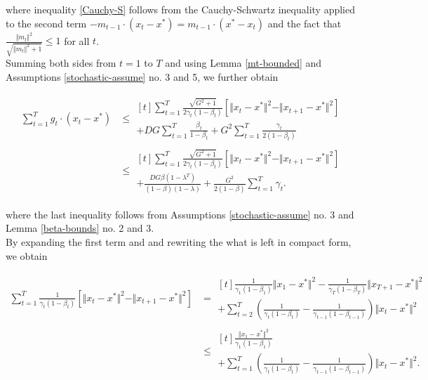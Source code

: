 \documentclass{article}
\begin{document}
where inequality \ref{Cauchy-S} follows from the Cauchy-Schwartz inequality applied to the second term $-m_{t-1} \cdot (x_t-x^*) = m_{t-1} \cdot (x^*-x_t)$ and the fact that $\frac{\Vert m_t\Vert^2}{\sqrt{\Vert m_t \Vert^2+1}} \le 1$ for all $t$.\\
Summing both sides from $t=1$ to $T$ and using Lemma \ref{mt-bounded} and Assumptions \ref{stochastic-assume} no. 3 and 5, we further obtain

\begin{align}
\sum_{t=1}^T g_t\cdot (x_t - x^*)  
& \le 
\begin{multlined}[t]
\sum_{t=1}^T \frac{\sqrt{G^2+1}}{2\gamma_t (1-\beta_t)}
\left[\Vert x_t-x^*\Vert^2 - \Vert x_{t+1} -x^*\Vert^2\right] \nonumber\\
+
DG\sum_{t=1}^T \frac{\beta_t}{1-\beta_t} 
+ G^2\sum_{t=1}^T \frac{\gamma_t }{2(1-\beta_t) } 
\end{multlined}\\
&\le
\begin{multlined}[t]
\sum_{t=1}^T \frac{\sqrt{G^2+1}}{2\gamma_t (1-\beta_t)}
\left[\Vert x_t-x^*\Vert^2 - \Vert x_{t+1} -x^*\Vert^2\right] \label{second-last} \\
+
\frac{DG\beta(1-\lambda^T)}{(1-\beta)(1-\lambda)}
+  \frac{ G^2}{2(1-\beta) } \sum_{t=1}^T \gamma_t.
\end{multlined}
\end{align}

where the last inequality follows from Assumptions \ref{stochastic-assume} no. 3 and Lemma \ref{beta-bounds} no. 2 and 3.\\
By expanding the first term and and rewriting the what is left in compact form, we obtain

\begin{align*}
\sum_{t=1}^T \frac{1}{\gamma_t (1-\beta_t)}
\left[\Vert x_t-x^*\Vert^2 - \Vert x_{t+1} -x^*\Vert^2\right]
&= 
\begin{multlined}[t]
\frac{1}{\gamma_1 (1-\beta_1)} \Vert x_1 - x^*\Vert^2 -
\frac{1}{\gamma_T (1-\beta_T)} \Vert x_{T+1} - x^*\Vert^2 \nonumber\\
+ \sum_{t=2}^T \left(\frac{1}{\gamma_t (1-\beta_t) } - \frac{1}{\gamma_{t-1} (1-\beta_{t-1})} \right)\Vert x_t - x^*\Vert^2
\end{multlined}\\
&\le 
\begin{multlined}[t]
\frac{\Vert x_1 - x^*\Vert^2}{\gamma_1 (1-\beta_1)}  \\
+
\sum_{t=1}^T \left(\frac{1}{\gamma_t (1-\beta_t) } - \frac{1}{\gamma_{t-1} (1-\beta_{t-1})} \right) \Vert x_t - x^*\Vert^2.
\end{multlined}\\
\end{align*}
\end{document}
